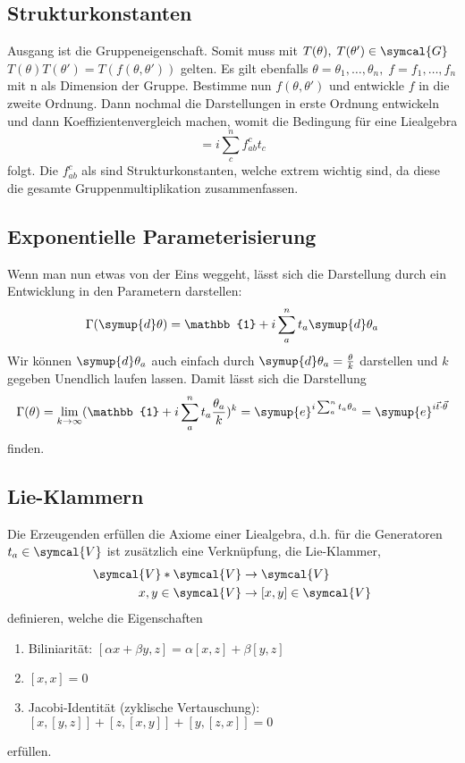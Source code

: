 \documentclass[
  captions=tableheading,  %
  titlepage=firstiscover, %
]{scrartcl}
\begin{document}
\subsection{Strukturkonstanten}
Ausgang ist die Gruppeneigenschaft. 
Somit muss mit $T(\theta), \; T(\theta') \in \symcal{G}$ $T(\theta)T(\theta') = T(f(\theta, \theta'))$ gelten.
Es gilt ebenfalls $\theta = \theta_1, \ldots, \theta_n, \; f = f_1, \ldots, f_n$ mit n als Dimension der Gruppe.
Bestimme nun $f(\theta, \theta')$ und entwickle $f$ in die zweite Ordnung.
Dann nochmal die Darstellungen in erste Ordnung entwickeln und dann Koeffizientenvergleich machen, womit 
die Bedingung für eine Liealgebra
\begin{equation*}
  [t_a, t_b] = i \sum_c^n f_{ab}^ct_c
\end{equation*}
folgt. 
Die $f_{ab}^c$ als sind Strukturkonstanten,
welche extrem wichtig sind, da diese die gesamte Gruppenmultiplikation zusammenfassen.
\subsection{Exponentielle Parameterisierung}
Wenn man nun etwas von der Eins weggeht, lässt sich die Darstellung durch 
ein Entwicklung in den Parametern darstellen:
\begin{equation*}
  \Gamma(\symup{d}\theta) = \mathbb{1} + i \sum_a^n t_a \symup{d}\theta_a 
\end{equation*}
Wir können $\symup{d}\theta_a$ auch einfach durch $\symup{d}\theta_a = \frac{\theta}{k}$ darstellen und $k$ gegeben
Unendlich laufen lassen.
Damit lässt sich die Darstellung
\begin{equation*}
  \Gamma(\theta) = \lim_{k \to \infty} (\mathbb{1} + i \sum_a^n t_a \frac{\theta_a}{k})^k = \symup{e}^{i\sum_a^n t_a \theta_a}
  = \symup{e}^{i\vec{t} \cdot \vec{\theta}}
\end{equation*}
finden.
\subsection{Lie-Klammern}
Die Erzeugenden erfüllen die Axiome einer Liealgebra, d.h. für die Generatoren $t_a \in \symcal{V}$ ist 
zusätzlich eine Verknüpfung, die Lie-Klammer, 
\begin{align*}
  \symcal{V} * \symcal{V} &\to \symcal{V} \\
  x,y \in \symcal{V}      &\to [x,y] \in \symcal{V}
\end{align*}
definieren, welche die Eigenschaften 
\begin{enumerate}
  \item Biliniarität: $[\alpha x + \beta y, z] = \alpha [x,z] + \beta [y,z]$
  \item $[x,x] = 0$
  \item Jacobi-Identität (zyklische Vertauschung): $[x, [y,z]] + [z,[x,y]] + [y,[z,x]] = 0$
\end{enumerate}
erfüllen.
\end{document}

